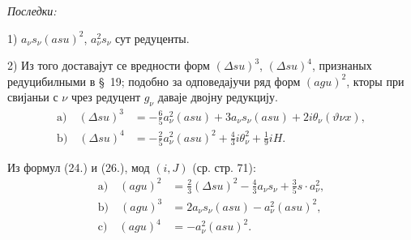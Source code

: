 ﻿\documentclass[11pt]{article}
\begin{document}
\noindent\textit{Последки:}

1) $a_{\nu}s_{\nu}(asu)^2$, $a_{\nu}^2s_{\nu}$ сут редуценты.

2) Из того доставајут се вредности форм $(\Delta su)^3$, $(\Delta su)^4$, признаных редуцибилными в \S\ 19; подобно за одповедајучи ряд форм $(agu)^2$, кторы при свијаньи с $\nu$ чрез редуцент $g_{\nu}$ даваје двојну редукцију.
\[
\tag{26}
\begin{aligned}
\mathrm{a)}\quad (\Delta su)^3&=-\frac65a_{\nu}^2(asu)+3a_{\nu}s_{\nu}(asu)+2i\theta_{\nu}(\vartheta\nu x),\\
\mathrm{b)}\quad (\Delta su)^4&=-\frac25a_{\nu}^2(asu)^2+\frac43i\theta_{\nu}^2+\frac19iH.
\end{aligned}
\]

Из формул (24.) и (26.), мод $(i,J)$ (ср. стр. 71):
\[
\tag{27}
\begin{aligned}
\mathrm{a)}\quad (agu)^2&=\frac23(\Delta su)^2-\frac43a_{\nu}s_{\nu}+\frac35s\cdot a_{\nu}^2,\\
\mathrm{b)}\quad (agu)^3&=2a_{\nu}s_{\nu}(asu)-a_{\nu}^2(asu)^2,\\
\mathrm{c)}\quad (agu)^4&=-a_{\nu}^2(asu)^2.
\end{aligned}
\]
\end{document}
